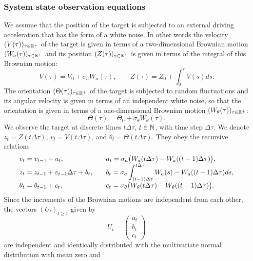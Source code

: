 \subsubsection{System state observation equations}
\label{sec:system_state_obsrv_eq}

We assume that the position of the target is subjected to an
external driving acceleration that has the form of a white noise.
In other words the velocity $({V}(\tau))_{\tau
  \in \R^+}$ of the target is given in terms of a two-dimensional Brownian motion
$({W}_a(\tau))_{\tau \in \R^+}$ and its position $({Z}(\tau))_{\tau \in \R^+}$ is
given in terms of the integral of this Brownian motion:
$$
{V}(\tau) = {V}_0 + \sigma_a  { W}_a(\tau), \quad \quad {Z}(\tau) = {Z}_0 + \int_0^\tau {V}(s) ds .
$$
The orientation  $(\Theta(\tau))_{\tau \in \R^+}$ of the target is subjected to random fluctuations and
its angular velocity is
given in terms of an independent white noise, so that the orientation
is  given in terms  of a one-dimensional Brownian motion $(W_\theta(\tau))_{\tau \in \R^+}$:
$$
\Theta(\tau) = \Theta_0+ \sigma_\theta W_\theta(\tau) .
$$
We observe the target at discrete times $t \Delta \tau$, $t \in \N$, with time step $\Delta \tau$.
We denote ${z}_t=  {Z}(t \Delta \tau)$, ${v}_t =  {V}(t \Delta \tau)$, and $\theta_t=  \Theta(t \Delta \tau)$.
They obey the recursive relations
\begin{equation} \label{eq:move_model}
  \begin{array}{ll}
\displaystyle  {v}_t = {v}_{t-1}+ {a}_{t} ,
&\quad \displaystyle {a}_{t}= \sigma_a  \big( {W}_a(t\Delta \tau) -{W}_a((t-1)\Delta \tau) \big), \\
\displaystyle  {z}_t = {z}_{t-1}+ {v}_{t-1} \Delta \tau + {b}_{t} , &\quad
\displaystyle {b}_{t}= \sigma_a  \int_{(t-1) \Delta \tau}^{t \Delta \tau}
{W}_a(s) -{W}_a((t-1)\Delta \tau)ds , \\
\displaystyle  \theta_t = \theta_{t-1}+ c_{t} , &\quad \displaystyle c_{t}=
\sigma_\theta  \big( W_\theta(t\Delta \tau) -W_\theta((t-1)\Delta
\tau) \big) .
\end{array}
\end{equation}
 Since the increments of the Brownian motions are independent from each other,
 the vectors $(U_t)_{t \geq 1}$ given by
 $$
 U_t=
 \begin{pmatrix}
 {a}_t\\
 {b}_t\\
 c_t\end{pmatrix}
 $$
 are independent and identically distributed
 with the multivariate normal distribution with mean zero and
